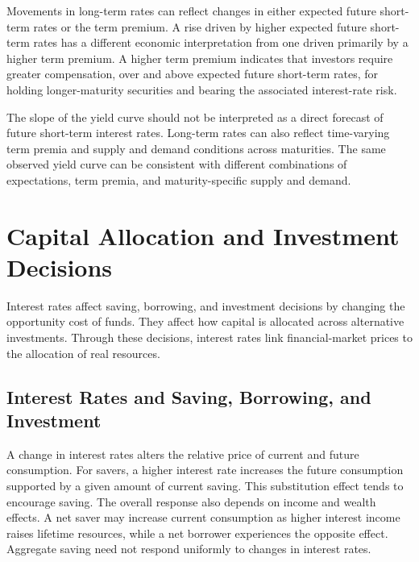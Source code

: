 Movements in long-term rates can reflect changes in either expected future short-term rates or the term premium. A rise driven by higher expected future short-term rates has a different economic interpretation from one driven primarily by a higher term premium. A higher term premium indicates that investors require greater compensation, over and above expected future short-term rates, for holding longer-maturity securities and bearing the associated interest-rate risk.

\begin{tcolorbox}[
  enhanced,
  breakable,
  colback=white,
  colframe=FinanceBlue,
  boxrule=0.7pt,
  sharp corners,
  borderline west={2.2pt}{0pt}{FinanceBlue},
  title=\textbf{Finance Perspective: Interpreting the Yield Curve},
  coltitle=white,
  colbacktitle=FinanceBlue,
  fonttitle=\bfseries,
  before skip=1.2em,
  after skip=1.2em
]


The slope of the yield curve should not be interpreted as a direct forecast of future short-term interest rates. Long-term rates can also reflect time-varying term premia and supply and demand conditions across maturities. The same observed yield curve can be consistent with different combinations of expectations, term premia, and maturity-specific supply and demand.
\end{tcolorbox}

\section{Capital Allocation and Investment Decisions}

Interest rates affect saving, borrowing, and investment decisions by changing the opportunity cost of funds. They affect how capital is allocated across alternative investments. Through these decisions, interest rates link financial-market prices to the allocation of real resources.

\subsection{Interest Rates and Saving, Borrowing, and Investment}

A change in interest rates alters the relative price of current and future consumption. For savers, a higher interest rate increases the future consumption supported by a given amount of current saving. This substitution effect tends to encourage saving. The overall response also depends on income and wealth effects. A net saver may increase current consumption as higher interest income raises lifetime resources, while a net borrower experiences the opposite effect. Aggregate saving need not respond uniformly to changes in interest rates.

